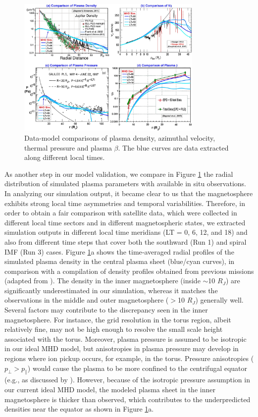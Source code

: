 \begin{figure}
    \centering
    \includegraphics[width=0.8\textwidth]{images2/comparison-plasma.jpg}
    \caption{Data-model comparisons of plasma density, azimuthal velocity, thermal pressure and plasma $\beta$. The blue curves are data extracted along different local times.}
    \label{fig:comparison-plasma}
\end{figure}

As another step in our model validation, we compare in Figure \ref{fig:comparison-plasma} the radial distribution of simulated plasma parameters with available in situ observations. In analyzing our simulation output, it became clear to us that the magnetosphere exhibits strong local time asymmetries and temporal variabilities. Therefore, in order to obtain a fair comparison with satellite data, which were collected in different local time sectors and in different magnetospheric states, we extracted simulation outputs in different local time meridians (LT = 0, 6, 12, and 18) and also from different time steps that cover both the southward (Run 1) and spiral IMF (Run 3) cases. Figure \ref{fig:comparison-plasma}a shows the time‐averaged radial profiles of the simulated plasma density in the central plasma sheet (blue/cyan curves), in comparison with a compilation of density profiles obtained from previous missions (adapted from ). The density in the inner magnetosphere (inside $\sim$10 $R_J$) are significantly underestimated in our simulation, whereas it matches the observations in the middle and outer magnetosphere ($>$10 $R_J$) generally well. Several factors may contribute to the discrepancy seen in the inner magnetosphere. For instance, the grid resolution in the torus region, albeit relatively fine, may not be high enough to resolve the small scale height associated with the torus. Moreover, plasma pressure is assumed to be isotropic in our ideal MHD model, but anisotropies in plasma pressure may develop in regions where ion pickup occurs, for example, in the torus. Pressure anisotropies ($p_\perp > p_\parallel$) would cause the plasma to be more confined to the centrifugal equator (e.g., as discussed by ). However, because of the isotropic pressure assumption in our current ideal MHD model, the modeled plasma sheet in the inner magnetosphere is thicker than observed, which contributes to the underpredicted densities near the equator as shown in Figure \ref{fig:comparison-plasma}a. 

